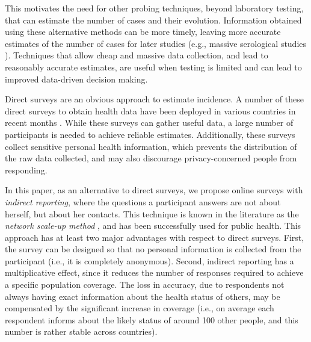 \documentclass{article}
\newcommand{\af}[1]{{#1}}
\begin{document}
This motivates the need for other probing techniques, beyond laboratory testing, that can estimate  the number of cases and their evolution. Information obtained using these alternative methods can be more timely, leaving more accurate estimates of the number of cases for later studies  (e.g.,  massive serological studies \cite{yang2012serological}).  Techniques that allow cheap and massive data collection, and lead to reasonably accurate estimates, 
are useful when testing is limited and can lead to improved data-driven decision making. 

Direct surveys are an obvious approach to estimate incidence. A number of these direct surveys to obtain health data have been deployed in various countries in recent months \cite{linares1920estimando,DBLP:journals/corr/abs-2004-01014,FB-survey}. While these surveys can gather  useful data, a large number of participants is needed to achieve reliable estimates. Additionally, these surveys collect sensitive personal health information, which prevents the distribution of the raw data collected, and may also discourage privacy-concerned people from responding.

In this paper, as an alternative to direct surveys, we propose \af{online} surveys with \textit{indirect reporting}, where the questions a participant answers are not about herself, but about her contacts. 
This technique is known in the literature as the \emph{network scale-up method} \cite{bernard1991estimating,bernard2010counting}, and has been successfully used for public health.
This approach has at least two major advantages with respect to direct surveys. First, the survey can be designed so that no personal information is collected from the participant (i.e., it is completely anonymous). Second, indirect reporting has a multiplicative effect, since it reduces the number of responses required to achieve a specific population coverage. The loss in accuracy, due to respondents not always having exact information about the health status of others, may be compensated by the significant increase in coverage (i.e., on average each respondent informs about the likely status of around 100 other \af{people, and this number is rather stable across countries}).
\end{document}

